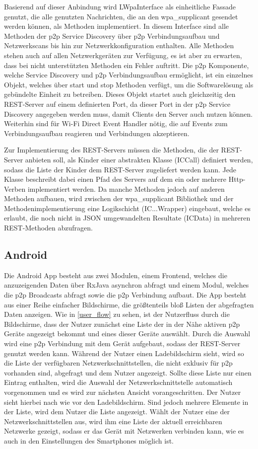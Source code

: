 		Basierend auf dieser Anbindung wird LWpaInterface als einheitliche Fassade genutzt, die alle genutzten Nachrichten, die an den wpa\_supplicant gesendet werden können, als Methoden implementiert.
		In diesem Interface sind alle Methoden der p2p Service Discovery über p2p Verbindungsaufbau und Netzwerkscans bis hin zur Netzwerkkonfiguration enthalten. Alle Methoden stehen auch auf allen Netzwerkgeräten zur Verfügung, es ist aber zu erwarten, dass bei nicht unterstützten Methoden ein Fehler auftritt.
		Die p2p Komponente, welche Service Discovery und p2p Verbindungsaufbau ermöglicht, ist ein einzelnes Objekt, welches über start und stop Methoden verfügt, um die Softwarelösung als gebündelte Einheit zu betreiben. Dieses Objekt startet auch gleichzeitig den REST-Server auf einem definierten Port, da dieser Port in der p2p Service Discovery angegeben werden muss, damit Clients den Server auch nutzen können. Weiterhin sind für Wi-Fi Direct Event Handler nötig, die auf Events zum Verbindungsaufbau reagieren und Verbindungen akzeptieren.
		
		Zur Implementierung des REST-Servers müssen die Methoden, die der REST-Server anbieten soll, als Kinder einer abstrakten Klasse (ICCall) definiert werden, sodass die Liste der Kinder dem REST-Server zugeliefert werden kann.
		Jede Klasse beschreibt dabei einen Pfad des Servers auf dem ein oder mehrere Http-Verben implementiert werden. Da manche Methoden jedoch auf anderen Methoden aufbauen, wird zwischen der wpa\_supplicant Bibliothek und der Methodenimplementierung eine Logikschicht (IC...Wrapper) eingebaut, welche es erlaubt, die noch nicht in JSON umgewandelten Resultate (ICData) in mehreren REST-Methoden abzufragen.
		
	\subsection{Android}

		Die Android App besteht aus zwei Modulen, einem Frontend, welches die anzuzeigenden Daten über RxJava asynchron abfragt und einem Modul, welches die p2p Broadcasts abfragt sowie die p2p Verbindung aufbaut.
		Die App besteht aus einer Reihe einfacher Bildschirme, die größtenteils bloß Listen der abgefragten Daten anzeigen. Wie in \figurename \ref{user_flow} zu sehen, ist der Nutzerfluss durch die Bildschirme, dass der Nutzer zunächst eine Liste der in der Nähe aktiven p2p Geräte angezeigt bekommt und eines dieser Geräte auswählt. Durch die Auswahl wird eine p2p Verbindung mit dem Gerät aufgebaut, sodass der REST-Server genutzt werden kann. Während der Nutzer einen Ladebildschirm sieht, wird so die Liste der verfügbaren Netzwerkschnittstellen, die nicht exklusiv für p2p vorhanden sind, abgefragt und dem Nutzer angezeigt. Sollte diese Liste nur einen Eintrag enthalten, wird die Auswahl der Netzwerkschnittstelle automatisch vorgenommen und es wird zur nächsten Ansicht vorangeschritten. Der Nutzer sieht hierbei nach wie vor den Ladebildschirm. Sind jedoch mehrere Elemente in der Liste, wird dem Nutzer die Liste angezeigt. Wählt der Nutzer eine der Netzwerkschnittstellen aus, wird ihm eine Liste der aktuell erreichbaren Netzwerke gezeigt, sodass er das Gerät mit Netzwerken verbinden kann, wie es auch in den Einstellungen des Smartphones möglich ist.
		

